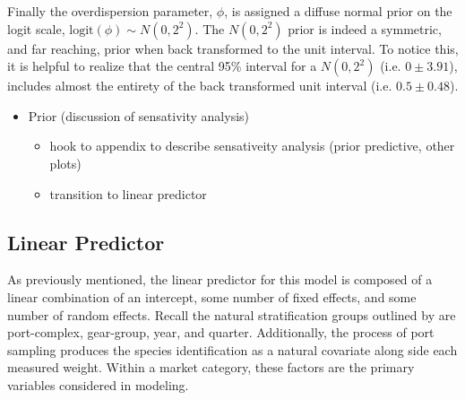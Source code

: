 \documentclass[12pt]{article}
\begin{document}
%
Finally the overdispersion parameter, \(\phi\), is assigned a diffuse
normal prior on the logit scale, \(\text{logit}(\phi) \sim N(0, 2^2)\).
The \(N(0, 2^2)\) prior is indeed a symmetric, and far reaching, prior
when back transformed to the unit interval. To notice this, it is
helpful to realize that the central 95\% interval for a \(N(0, 2^2)\)
(i.e. \(0\pm3.91\)), includes almost the entirety of the back
transformed unit interval (i.e. \(0.5\pm0.48\)).


%

\begin{itemize}
\item Prior (discussion of sensativity analysis)
	\begin{itemize}
	\item hook to appendix to describe sensativeity analysis (prior predictive, other plots)
	\item transition to linear predictor
	\end{itemize}
\end{itemize}

%
%
\subsection{Linear Predictor}\label{lp}
%
%

%
As previously mentioned, the linear predictor for this model is composed of a 
linear combination of an intercept, some number of fixed effects, 
and some number of random effects. Recall the natural stratification groups 
outlined by \cite{sen_sampling_1984} are port-complex, gear-group, year, and 
quarter. Additionally, the process of port sampling produces the species 
identification as a natural covariate along side each measured weight. Within 
a market category, these factors are the primary variables considered in 
modeling.
\end{document}
